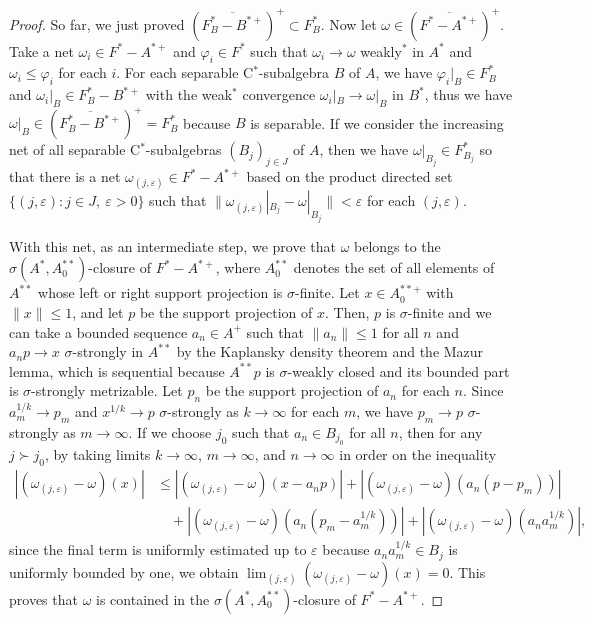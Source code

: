\documentclass[a4paper]{amsart}
\newcommand{\e}{\varepsilon}
\theoremstyle{plain}
\theoremstyle{definition}
\begin{document}
\begin{proof}
So far, we just proved $(\overline{F_B^*-B^{*+}})^+\subset F_B^*$.
Now let $\omega\in(\overline{F^*-A^{*+}})^+$.
Take a net $\omega_i\in F^*-A^{*+}$ and $\varphi_i\in F^*$ such that $\omega_i\to\omega$ weakly$^*$ in $A^*$ and $\omega_i\le\varphi_i$ for each $i$.
For each separable C$^*$-subalgebra $B$ of $A$, we have $\varphi_i|_B\in F^*_{B}$ and $\omega_i|_B\in F^*_B-B^{*+}$ with the weak$^*$ convergence $\omega_i|_B\to\omega|_B$ in $B^*$, thus we have $\omega|_B\in(\overline{F_B^*-B^{*+}})^+=F_B^*$ because $B$ is separable.
If we consider the increasing net of all separable C$^*$-subalgebras $(B_j)_{j\in J}$ of $A$, then we have $\omega|_{B_j}\in F_{B_j}^*$ so that there is a net $\omega_{(j,\e)}\in F^*-A^{*+}$ based on the product directed set $\{(j,\e):j\in J,\ \e>0\}$ such that $\|\omega_{(j,\e)}|_{B_j}-\omega|_{B_j}\|<\e$ for each $(j,\e)$.

With this net, as an intermediate step, we prove that $\omega$ belongs to the $\sigma(A^*,A_0^{**})$-closure of $F^*-A^{*+}$, where $A_0^{**}$ denotes the set of all elements of $A^{**}$ whose left or right support projection is $\sigma$-finite.
Let $x\in A_0^{**+}$ with $\|x\|\le1$, and let $p$ be the support projection of $x$.
Then, $p$ is $\sigma$-finite and we can take a bounded sequence $a_n\in A^+$ such that $\|a_n\|\le1$ for all $n$ and $a_np\to x$ $\sigma$-strongly in $A^{**}$ by the Kaplansky density theorem and the Mazur lemma, which is sequential because $A^{**}p$ is $\sigma$-weakly closed and its bounded part is $\sigma$-strongly metrizable.
Let $p_n$ be the support projection of $a_n$ for each $n$.
Since $a_m^{1/k}\to p_m$ and $x^{1/k}\to p$ $\sigma$-strongly as $k\to\infty$ for each $m$, we have $p_m\to p$ $\sigma$-strongly as $m\to\infty$.
If we choose $j_0$ such that $a_n\in B_{j_0}$ for all $n$, then for any $j\succ j_0$, by taking limits $k\to\infty$, $m\to\infty$, and $n\to\infty$ in order on the inequality
\begin{align*}
|(\omega_{(j,\e)}-\omega)(x)|
&\le|(\omega_{(j,\e)}-\omega)(x-a_np)|+|(\omega_{(j,\e)}-\omega)(a_n(p-p_m))|\\
&\quad+|(\omega_{(j,\e)}-\omega)(a_n(p_m-a_m^{1/k}))|+|(\omega_{(j,\e)}-\omega)(a_na_m^{1/k})|,
\end{align*}
since the final term is uniformly estimated up to $\e$ because $a_na_m^{1/k}\in B_j$ is uniformly bounded by one, we obtain $\lim_{(j,\e)}(\omega_{(j,\e)}-\omega)(x)=0$.
This proves that $\omega$ is contained in the $\sigma(A^*,A_0^{**})$-closure of $F^*-A^{*+}$.




\end{proof}
\end{document}
